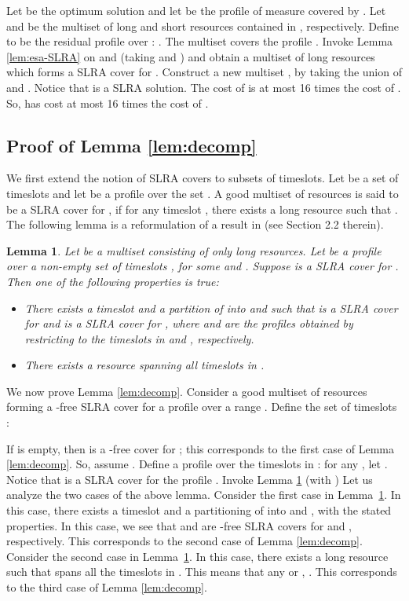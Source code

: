 \documentclass[11pt]{article}
\newtheorem{lemma}[theorem]{Lemma}
\newcommand{\qed} {\hfill}
\begin{document}
Let  be the optimum solution and let  be the profile of measure  covered by .
Let  and  be the multiset of long and short resources contained in , respectively.
Define  to be the residual profile over : .
The multiset  covers the profile . 
Invoke Lemma \ref{lem:esa-SLRA} on  and  (taking  and )
and obtain a multiset of long resources  which forms a SLRA cover for . 
Construct a new multiset , by taking the union of  and . 
Notice that  is a SLRA solution.  The cost  of  is at most 16 times the cost of .
So,  has cost at most 16 times the cost of .


\subsection{Proof of Lemma \ref{lem:decomp}}
We first extend the notion of SLRA covers to subsets of timeslots.
Let  be a set of timeslots and let  be a profile over the set .
A good multiset of resources  is said to be a SLRA cover for , 
if for any timeslot , there exists a long resource  such that 
.
The following lemma is a reformulation of a result in \cite{esa2011} (see Section 2.2 therein).

\begin{lemma}
\label{lem:esa-timecut}
Let  be a multiset consisting of only long resources. 
Let  be a profile over a non-empty set of timeslots ,
for some  and . 
Suppose  is a SLRA cover for . Then one of the following properties is true:
\begin{itemize}
\item
There exists a timeslot  and a partition of  into  and  such that
 is a SLRA cover for  and  is a SLRA cover for ,
where  and  are the profiles obtained by restricting 
to the timeslots in  and , respectively.
\item
There exists a resource  spanning all timeslots in .
\end{itemize}
\end{lemma}

We now prove Lemma \ref{lem:decomp}. 
Consider a good multiset of resources  forming a -free SLRA cover for a profile  over a range .
Define the set of timeslots :

If  is empty, then  is a -free cover for ; 
this corresponds to the first case of Lemma \ref{lem:decomp}.
So, assume .
Define a profile  over the timeslots in : for any ,
let .
Notice that  is a SLRA cover for the profile . 
Invoke Lemma \ref{lem:esa-timecut} (with )
Let us analyze the two cases of the above lemma. 
Consider the first case in Lemma~\ref{lem:esa-timecut}. 
In this case, there exists a timeslot  and a partitioning of  into  and ,
with the stated properties.
In this case, we see that  and  are -free SLRA covers
for  and , respectively. This corresponds to the second case of Lemma \ref{lem:decomp}.
Consider the second case in Lemma~\ref{lem:esa-timecut}. In this case, there exists a long resource  such that  spans
all the timeslots in . This means that any  or ,
. This corresponds to the third case of Lemma \ref{lem:decomp}.
\qed
\end{document}
